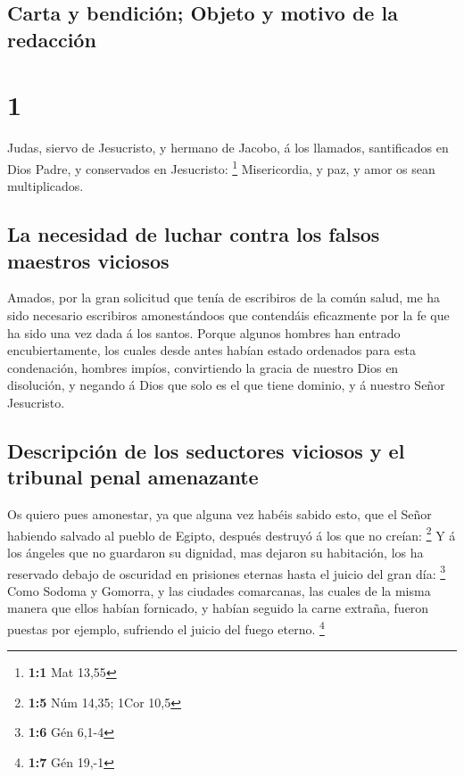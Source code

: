 \hypertarget{carta-y-bendiciuxf3n-objeto-y-motivo-de-la-redacciuxf3n}{%
\subsection{Carta y bendición; Objeto y motivo de la
redacción}\label{carta-y-bendiciuxf3n-objeto-y-motivo-de-la-redacciuxf3n}}

\hypertarget{section}{%
\section{1}\label{section}}

 Judas, siervo de Jesucristo, y hermano de Jacobo, á los
llamados, santificados en Dios Padre, y conservados en Jesucristo:
\footnote{\textbf{1:1} Mat 13,55}  Misericordia, y paz, y
amor os sean multiplicados.

\hypertarget{la-necesidad-de-luchar-contra-los-falsos-maestros-viciosos}{%
\subsection{La necesidad de luchar contra los falsos maestros
viciosos}\label{la-necesidad-de-luchar-contra-los-falsos-maestros-viciosos}}

 Amados, por la gran solicitud que tenía de escribiros de la
común salud, me ha sido necesario escribiros amonestándoos que
contendáis eficazmente por la fe que ha sido una vez dada á los santos.
 Porque algunos hombres han entrado encubiertamente, los
cuales desde antes habían estado ordenados para esta condenación,
hombres impíos, convirtiendo la gracia de nuestro Dios en disolución, y
negando á Dios que solo es el que tiene dominio, y á nuestro Señor
Jesucristo.

\hypertarget{descripciuxf3n-de-los-seductores-viciosos-y-el-tribunal-penal-amenazante}{%
\subsection{Descripción de los seductores viciosos y el tribunal penal
amenazante}\label{descripciuxf3n-de-los-seductores-viciosos-y-el-tribunal-penal-amenazante}}

 Os quiero pues amonestar, ya que alguna vez habéis sabido
esto, que el Señor habiendo salvado al pueblo de Egipto, después
destruyó á los que no creían: \footnote{\textbf{1:5} Núm 14,35; 1Cor
  10,5}  Y á los ángeles que no guardaron su dignidad, mas
dejaron su habitación, los ha reservado debajo de oscuridad en prisiones
eternas hasta el juicio del gran día: \footnote{\textbf{1:6} Gén 6,1-4}
 Como Sodoma y Gomorra, y las ciudades comarcanas, las
cuales de la misma manera que ellos habían fornicado, y habían seguido
la carne extraña, fueron puestas por ejemplo, sufriendo el juicio del
fuego eterno. \footnote{\textbf{1:7} Gén 19,-1}

